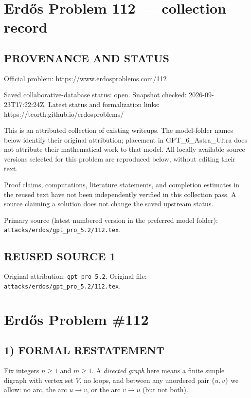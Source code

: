 \section*{Erd\H{o}s Problem 112 --- collection record}

\subsection*{PROVENANCE AND STATUS}
Official problem: https://www.erdosproblems.com/112

Saved collaborative-database status: open.
Snapshot checked: 2026-09-23T17:22:24Z.
Latest status and formalization links: https://teorth.github.io/erdosproblems/

This is an attributed collection of existing writeups. The model-folder names below identify their original attribution; placement in GPT\_6\_Astra\_Ultra does not attribute their mathematical work to that model. All locally available source versions selected for this problem are reproduced below, without editing their text.

Proof claims, computations, literature statements, and completion estimates in the reused text have not been independently verified in this collection pass. A source claiming a solution does not change the saved upstream status.

Primary source (latest numbered version in the preferred model folder): \texttt{attacks/erdos/gpt\_pro\_5.2/112.tex}.

\subsection*{REUSED SOURCE 1}
Original attribution: \texttt{gpt\_pro\_5.2}.
Original file: \texttt{attacks/erdos/gpt\_pro\_5.2/112.tex}.


\section*{Erd\H{o}s Problem \#112}

\subsection*{1) FORMAL RESTATEMENT}
Fix integers $n\ge1$ and $m\ge1$.  A \emph{directed graph} here means a finite simple digraph with vertex set $V$, no loops, and between any unordered pair $\{u,v\}$ we allow: no arc, the arc $u\to v$, or the arc $v\to u$ (but not both).


